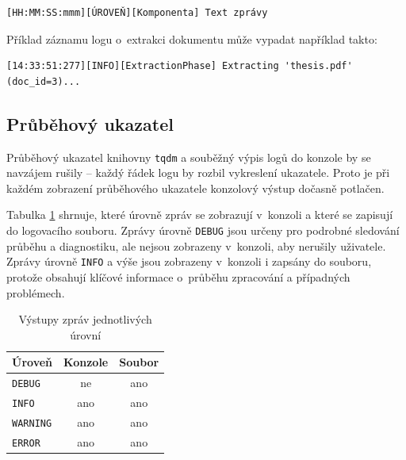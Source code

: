 \documentclass[czech, bc, kiv, he, iso690numb, pdf]{fasthesis}
\begin{document}
\lstset{style=plain}
\begin{lstlisting}
[HH:MM:SS:mmm][ÚROVEŇ][Komponenta] Text zprávy
\end{lstlisting}

Příklad záznamu logu o~extrakci dokumentu může vypadat například takto:
\lstset{style=plain}
\begin{lstlisting}
[14:33:51:277][INFO][ExtractionPhase] Extracting 'thesis.pdf' (doc_id=3)...
\end{lstlisting}

\subsection{Průběhový ukazatel}

Průběhový ukazatel knihovny \texttt{tqdm} a souběžný výpis logů do konzole by se navzájem rušily -- každý řádek logu by rozbil vykreslení ukazatele. Proto je při každém zobrazení průběhového ukazatele konzolový výstup dočasně potlačen. %

Tabulka \ref{tab:log-levels} shrnuje, které úrovně zpráv se zobrazují v~konzoli a které se zapisují do logovacího souboru. Zprávy úrovně \texttt{DEBUG} jsou určeny pro podrobné sledování průběhu a diagnostiku, ale nejsou zobrazeny v~konzoli, aby nerušily uživatele. Zprávy úrovně \texttt{INFO} a výše jsou zobrazeny v~konzoli i zapsány do souboru, protože obsahují klíčové informace o~průběhu zpracování a případných problémech.

\begin{table}[]
\centering
\caption{Výstupy zpráv jednotlivých úrovní}
\label{tab:log-levels}
\begin{tabular}{lcc}
\hline\hline
\textbf{Úroveň} & \textbf{Konzole} & \textbf{Soubor} \\
\hline
\texttt{DEBUG}   & ne  & ano \\
\texttt{INFO}    & ano & ano \\
\texttt{WARNING} & ano & ano \\
\texttt{ERROR}   & ano & ano \\
\hline\hline
\end{tabular}
\end{table}

\end{document}
